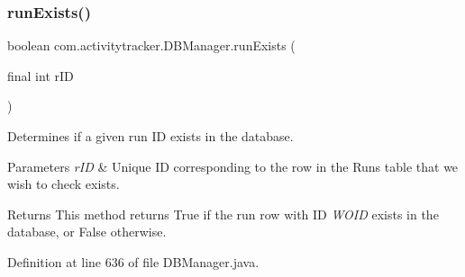 \mbox{\label{classcom_1_1activitytracker_1_1_d_b_manager_a723ac1c573bacdd0b62894357bd65a9b}} 
\subsubsection{\texorpdfstring{run\+Exists()}{runExists()}}
{\footnotesize\ttfamily boolean com.\+activitytracker.\+D\+B\+Manager.\+run\+Exists (\begin{DoxyParamCaption}\item[{final int}]{r\+ID }\end{DoxyParamCaption})}

Determines if a given run ID exists in the database.


\begin{DoxyParams}{Parameters}
{\em r\+ID} & Unique ID corresponding to the row in the Runs table that we wish to check exists.\\
\hline
\end{DoxyParams}
\begin{DoxyReturn}{Returns}
This method returns True if the run row with ID {\itshape W\+O\+ID} exists in the database, or False otherwise. 
\end{DoxyReturn}


Definition at line 636 of file D\+B\+Manager.\+java.


